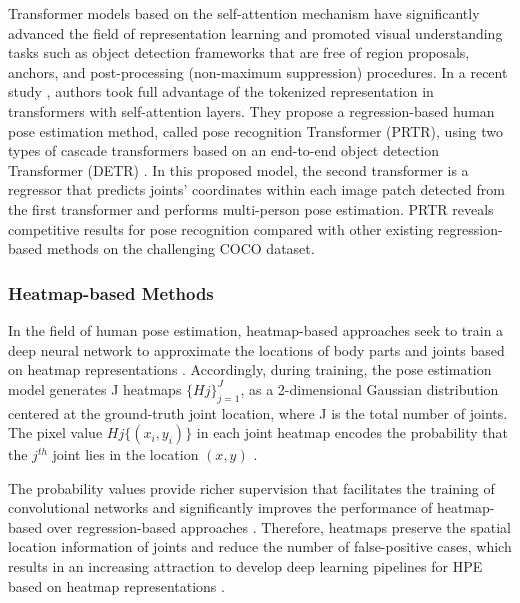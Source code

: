 Transformer models \cite{vaswani_attention_2017} based on the self-attention mechanism have significantly advanced the field of representation learning and promoted visual understanding tasks such as object detection frameworks that are free of region proposals, anchors, and post-processing (non-maximum suppression) procedures. In a recent study \cite{li_pose_2021}, authors took full advantage of the tokenized representation in transformers with self-attention layers. They propose a regression-based human pose estimation method, called pose recognition Transformer (PRTR), using two types of cascade transformers based on an end-to-end object detection Transformer (DETR) \cite{carion_end--end_2020}. In this proposed model, the second transformer is a regressor that predicts joints' coordinates within each image patch detected from the first transformer and performs multi-person pose estimation. PRTR reveals competitive results for pose recognition compared with other existing regression-based methods on the challenging COCO dataset.


\subsubsection{Heatmap-based Methods}

In the field of human pose estimation, heatmap-based approaches seek to train a deep neural network to approximate the locations of body parts and joints based on heatmap representations \cite{chen_articulated_2014, newell_stacked_2016, wei_convolutional_2016}. Accordingly, during training, the pose estimation model generates J heatmaps $\{Hj\}_{j=1}^J$, as a 2-dimensional Gaussian distribution centered at the ground-truth joint location, where J is the total number of joints. The pixel value $Hj \{(x_i,y_i)\}$ in each joint heatmap encodes the probability that the $j^{th}$ joint lies in the location $(x,y)$  \cite{tompson_efficient_2015, tompson_joint_2014}. 

The probability values provide richer supervision that facilitates the training of convolutional networks and significantly improves the performance of heatmap-based over regression-based approaches \cite{artacho_unipose_2020, bulat_human_2016,gkioxari_chained_2016, lifshitz_human_2016,newell_stacked_2016,tompson_efficient_2015}. Therefore, heatmaps preserve the spatial location information of joints and reduce the number of false-positive cases, which results in an increasing attraction to develop deep learning pipelines for HPE based on heatmap representations \cite{carreira_human_2016,luo_lstm_2018,toshev_deeppose_2014,wei_convolutional_2016}.

